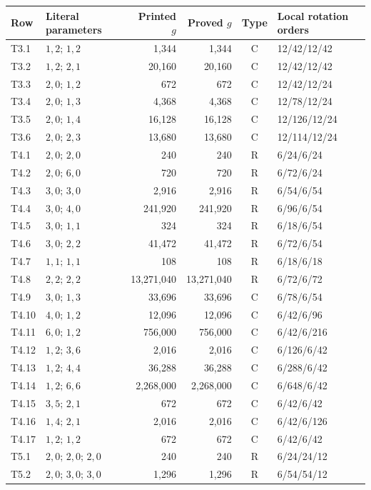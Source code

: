 \begin{longtable}{llrrcl}
\toprule Row&Literal parameters&Printed $g$&Proved $g$&Type&Local rotation orders\\\midrule\endhead
T3.1 & $1,2;\,1,2$ & 1,344 & 1,344 & C & 12/42/12/42 \\
T3.2 & $1,2;\,2,1$ & 20,160 & 20,160 & C & 12/42/12/42 \\
T3.3 & $2,0;\,1,2$ & 672 & 672 & C & 12/42/12/24 \\
T3.4 & $2,0;\,1,3$ & 4,368 & 4,368 & C & 12/78/12/24 \\
T3.5 & $2,0;\,1,4$ & 16,128 & 16,128 & C & 12/126/12/24 \\
T3.6 & $2,0;\,2,3$ & 13,680 & 13,680 & C & 12/114/12/24 \\
T4.1 & $2,0;\,2,0$ & 240 & 240 & R & 6/24/6/24 \\
T4.2 & $2,0;\,6,0$ & 720 & 720 & R & 6/72/6/24 \\
T4.3 & $3,0;\,3,0$ & 2,916 & 2,916 & R & 6/54/6/54 \\
T4.4 & $3,0;\,4,0$ & 241,920 & 241,920 & R & 6/96/6/54 \\
T4.5 & $3,0;\,1,1$ & 324 & 324 & R & 6/18/6/54 \\
T4.6 & $3,0;\,2,2$ & 41,472 & 41,472 & R & 6/72/6/54 \\
T4.7 & $1,1;\,1,1$ & 108 & 108 & R & 6/18/6/18 \\
T4.8 & $2,2;\,2,2$ & 13,271,040 & 13,271,040 & R & 6/72/6/72 \\
T4.9 & $3,0;\,1,3$ & 33,696 & 33,696 & C & 6/78/6/54 \\
T4.10 & $4,0;\,1,2$ & 12,096 & 12,096 & C & 6/42/6/96 \\
T4.11 & $6,0;\,1,2$ & 756,000 & 756,000 & C & 6/42/6/216 \\
T4.12 & $1,2;\,3,6$ & 2,016 & 2,016 & C & 6/126/6/42 \\
T4.13 & $1,2;\,4,4$ & 36,288 & 36,288 & C & 6/288/6/42 \\
T4.14 & $1,2;\,6,6$ & 2,268,000 & 2,268,000 & C & 6/648/6/42 \\
T4.15 & $3,5;\,2,1$ & 672 & 672 & C & 6/42/6/42 \\
T4.16 & $1,4;\,2,1$ & 2,016 & 2,016 & C & 6/42/6/126 \\
T4.17 & $1,2;\,1,2$ & 672 & 672 & C & 6/42/6/42 \\
T5.1 & $2,0;\,2,0;\,2,0$ & 240 & 240 & R & 6/24/24/12 \\
T5.2 & $2,0;\,3,0;\,3,0$ & 1,296 & 1,296 & R & 6/54/54/12 \\

\end{longtable}
